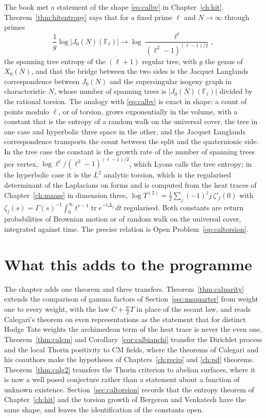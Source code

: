 The book met a statement of the shape \eqref{eq:calbv} in Chapter~\ref{ch:hit}. Theorem~\ref{thm:hitentropy} says that for a fixed prime $\ell$ and $N\to\infty$ through primes
\[
\frac1g\log|J_0(N)(\mathbb F_\ell)|\longrightarrow\log\frac{\ell^\ell}{(\ell^2-1)^{(\ell-1)/2}},
\]
the spanning tree entropy of the $(\ell+1)$ regular tree, with $g$ the genus of $X_0(N)$, and that the bridge between the two sides is the Jacquet Langlands correspondence between $J_0(N)$ and the supersingular isogeny graph in characteristic $N$, whose number of spanning trees is $|J_0(N)(\mathbb F_\ell)|$ divided by the rational torsion. The analogy with \eqref{eq:calbv} is exact in shape: a count of points modulo $\ell$, or of torsion, grows exponentially in the volume, with a constant that is the entropy of a random walk on the universal cover, the tree in one case and hyperbolic three space in the other, and the Jacquet Langlands correspondence transports the count between the split and the quaternionic side. In the tree case the constant is the growth rate of the number of spanning trees per vertex, $\log\ell^\ell/(\ell^2-1)^{(\ell-1)/2}$, which Lyons calls the tree entropy; in the hyperbolic case it is the $L^2$ analytic torsion, which is the regularised determinant of the Laplacians on forms and is computed from the heat traces of Chapter~\ref{ch:maass} in dimension three, $\log T^{(2)}=\frac12\sum_j(-1)^jj\,\zeta'_j(0)$ with $\zeta_j(s)=\Gamma(s)^{-1}\int_0^\infty t^{s-1}\operatorname{tr}e^{-t\Delta_j}\,dt$ regularised. Both constants are return probabilities of Brownian motion or of random walk on the universal cover, integrated against time. The precise relation is Open Problem~\ref{op:caltorsion}.

\section{What this adds to the programme}

The chapter adds one theorem and three transfers. Theorem~\ref{thm:calparity} extends the comparison of gamma factors of Section~\ref{sec:msquarter} from weight one to every weight, with the law $C+\frac w2T$ in place of the secant law, and reads Calegari's theorem on even representations as the statement that for distinct Hodge Tate weights the archimedean term of the heat trace is never the even one. Theorem~\ref{thm:calcm} and Corollary~\ref{cor:calbianchi} transfer the Dirichlet process and the local Thorin positivity to CM fields, where the theorems of Calegari and his coauthors make the hypotheses of Chapters~\ref{ch:recip} and \ref{ch:pd} theorems. Theorem~\ref{thm:calg2} transfers the Thorin criterion to abelian surfaces, where it is now a well posed conjecture rather than a statement about a function of unknown existence. Section~\ref{sec:caltorsion} records that the entropy theorem of Chapter~\ref{ch:hit} and the torsion growth of Bergeron and Venkatesh have the same shape, and leaves the identification of the constants open.

